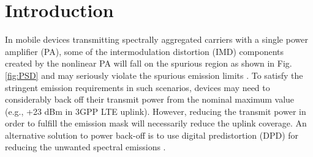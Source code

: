 \section{Introduction}
In mobile devices transmitting spectrally aggregated carriers with a single power amplifier (PA), some of the intermodulation distortion (IMD) components created by the nonlinear PA will fall on the spurious region as shown in Fig. \ref{fig:PSD} and may seriously violate the spurious emission limits \cite{Commag_abdelaziz,3GPP_CA_Emissions_1,3GPP_CA_Emissions_2,LaehteensuoMay2013}. To satisfy the stringent emission requirements in such scenarios, devices may need to considerably back off their transmit power from the nominal maximum value (e.g., +23 dBm in 3GPP LTE uplink). However, reducing the transmit power in order to fulfill the emission mask will necessarily reduce the uplink coverage. An alternative solution to power back-off is to use digital predistortion (DPD) for reducing the unwanted spectral emissions \cite{P.RoblinJan.2008,J.KimJan.2013,S.A.BassamAug.2012,ICASSP2014,Commag_abdelaziz}. 

